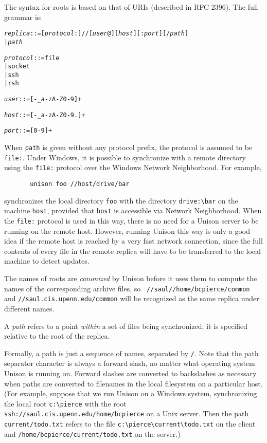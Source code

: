\documentclass{article}
\newcommand{\NT}[1]{\textit{#1}}
\begin{document}
The syntax for roots is based on that of URIs (described in RFC 2396).
The full grammar is: 
\begin{alltt}
  \NT{replica} ::= [\NT{protocol}:]//[\NT{user}@][\NT{host}][:\NT{port}][/\NT{path}]
           |  \NT{path}

  \NT{protocol} ::= file
            |  socket
            |  ssh
            |  rsh

  \NT{user} ::= [-_a-zA-Z0-9]+

  \NT{host} ::= [-_a-zA-Z0-9.]+

  \NT{port} ::= [0-9]+
\end{alltt}
When \verb|path| is given without any protocol prefix, the protocol is
assumed to be \verb|file:|.  Under Windows, it is possible to
synchronize with a remote directory using the \verb|file:| protocol over
the Windows Network Neighborhood.  For example,
\begin{verbatim}
       unison foo //host/drive/bar
\end{verbatim}
\noindent
synchronizes the local directory \verb|foo| with the directory
\verb|drive:\bar| on the machine \verb|host|, provided that \verb|host|
is accessible via Network Neighborhood.  When the \verb|file:| protocol
is used in this way, there is no need for a Unison server to be running
on the remote host.  However, running Unison this way is only a good
idea if the remote host is reached by a very fast network connection,
since the full contents of every file in the remote replica will have to
be transferred to the local machine to detect updates.

The names of roots are {\em canonized} by Unison before it uses them
to compute the names of the corresponding archive files, so {\tt
  //saul//home/bcpierce/common} and {\tt //saul.cis.upenn.edu/common}
will be recognized as the same replica under different names.


A {\em path} refers to a point {\em within} a set of files being
synchronized; it is specified relative to the root of the replica.

Formally, a path is just a sequence of names, separated by \verb|/|.
Note that the path separator character is always a forward slash, no
matter what operating system Unison is running on.  Forward slashes
are converted to backslashes as necessary when paths are converted to
filenames in the local filesystem on a particular host.
%
(For example, suppose that we run Unison on a Windows system, synchronizing
the local root \verb|c:\pierce| with the root
\verb|ssh://saul.cis.upenn.edu/home/bcpierce| on a Unix server.  Then
the path \verb|current/todo.txt| refers to the file
\verb|c:\pierce\current\todo.txt| on the client and
\verb|/home/bcpierce/current/todo.txt| on the server.)
\end{document}
